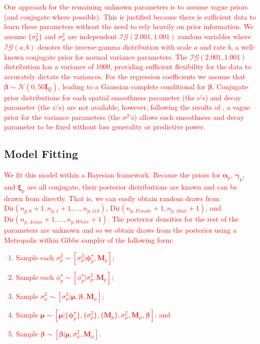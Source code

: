 \documentclass[final]{statsoc}
\begin{document}
\textcolor{red}{Our approach for the remaining unknown parameters is to assume vague priors (and conjugate 
where possible). This is justified because there is sufficient data to learn these parameters without the need to rely heavily on prior information. We assume $\{\sigma^2_p\}$ and $\sigma^2_\mu$ are independent 
$\mathcal{IG}\left(2.001, 1.001\right)$ 
random variables where $\mathcal{IG}(a,b)$ denotes the inverse-gamma distribution with scale 
$a$ and rate $b$, a well-known conjugate prior for normal variance parameters. The $\mathcal{IG}(2.001, 1.001)$ distribution has a variance of 1000, providing sufficient flexibility for the data to accurately dictate the variances. For the regression coefficients we assume that $\boldsymbol{\beta} \sim 
\mathcal{N}(0, 50\mathbf{I}_{Q})$, leading to a Gaussian complete conditional for $\boldsymbol{\beta}$. 
Conjugate prior distributions for each spatial smoothness parameter (the $\nu$'s) and decay 
parameter (the $\psi$'s) are not available; however, following the results of \cite{Zhang2004}, 
a vague prior for the variance parameters (the $\sigma^2$'s) allows each smoothness and decay 
parameter to be fixed without loss generality or predictive power.}

\subsection{Model Fitting}
\textcolor{red}{We fit this model within a Bayesian framework. Because the priors
for $\boldsymbol{\alpha}_p$, $\boldsymbol{\gamma}_p$, and $\boldsymbol{\xi}_p$ are all conjugate, their posterior
distributions are known and can be drawn from directly. That is, we can easily obtain random draws from $\text{Dir}(n_{p,0} + 1, n_{p,1} + 1, \dots, n_{p,113})$, $\text{Dir}(n_{p,Female} + 1, n_{p,Male} + 1)$, and $\text{Dir}(n_{p,Asian} + 1, \dots, n_{p,White} + 1)$. The posterior densities for the rest of the parameters are unknown and so we obtain draws from the posterior using a Metropolis within Gibbs sampler of the following form:
\begin{enumerate}
  \item \label{draws2} Sample each $\sigma^2_p \sim [ \sigma^2_p | \boldsymbol{\phi}^\star_p, \mathbf{M}_p]$;
  \item \label{drawphi} Sample each $\phi^\star_p \sim [ \phi^\star_p | \sigma^2_p, \mathbf{M}_p ]$;
  \item \label{drawsmu} Sample $\sigma^2_\mu \sim [ \sigma^2_\mu | \boldsymbol{\mu}, \boldsymbol{\beta}, 
    \mathbf{M}_\mu ]$;
  \item \label{drawmu} Sample $\boldsymbol{\mu} \sim [ \boldsymbol{\mu} | \{\boldsymbol{\phi}^\star_p\}, 
    \{\sigma^2_p\}, \{\mathbf{M}_p\}, \sigma^2_\mu, \mathbf{M}_\mu, \boldsymbol{\beta} ]$; and
  \item \label{drawbeta} Sample $\boldsymbol{\beta} \sim [ \boldsymbol{\beta} | \boldsymbol{\mu}, 
    \sigma^2_\mu, \mathbf{M}_\mu ]$.
\end{enumerate}}
\end{document}

